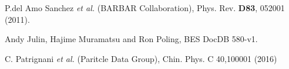 \newpage
\begin{thebibliography}{99}

P.del Amo Sanchez {\it et al.}  (BARBAR Collaboration),
Phys. Rev. \textbf{D83}, 052001 (2011).

Andy Julin, Hajime Muramatsu and Ron Poling,  
BES\uppercase\expandafter{} DocDB 580-v1.

C. Patrignani {\it et al.}  (Paritcle Data Group),
Chin. Phys. C 40,100001 (2016)

\end{thebibliography}
